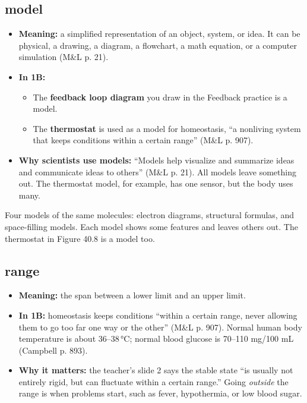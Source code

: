 \documentclass[11pt,letterpaper]{article}
\begin{document}
\subsection{model}
\begin{itemize}
  \item \textbf{Meaning:} a simplified representation of an object, system, or idea. It can be physical, a drawing, a diagram, a flowchart, a math equation, or a computer simulation (M\&L p. 21).
  \item \textbf{In 1B:}
  \begin{itemize}
    \item The \textbf{feedback loop diagram} you draw in the Feedback practice is a model.
    \item The \textbf{thermostat} is used as a model for homeostasis, ``a nonliving system that keeps conditions within a certain range'' (M\&L p. 907).
  \end{itemize}
  \item \textbf{Why scientists use models:} ``Models help visualize and summarize ideas and communicate ideas to others'' (M\&L p. 21). All models leave something out. The thermostat model, for example, has one sensor, but the body uses many.
\end{itemize}

  {Four models of the same molecules: electron diagrams, structural formulas, and space-filling models. Each model shows some features and leaves others out. The thermostat in Figure 40.8 is a model too.}

\subsection{range}
\begin{itemize}
  \item \textbf{Meaning:} the span between a lower limit and an upper limit.
  \item \textbf{In 1B:} homeostasis keeps conditions ``within a certain range, never allowing them to go too far one way or the other'' (M\&L p. 907). Normal human body temperature is about 36–38\,°C; normal blood glucose is 70–110 mg/100 mL (Campbell p. 893).
  \item \textbf{Why it matters:} the teacher's slide 2 says the stable state ``is usually not entirely rigid, but can fluctuate within a certain range.'' Going \emph{outside} the range is when problems start, such as fever, hypothermia, or low blood sugar.
\end{itemize}
\end{document}
